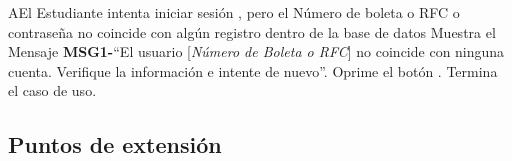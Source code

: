 		\begin{UCtrayectoriaA}{A}{El Estudiante intenta iniciar sesión , pero el Número de boleta o RFC o contraseña no coincide con algún registro dentro de la base de datos}
			\UCpaso Muestra el Mensaje {\bf MSG1-}``El usuario [{\em Número de Boleta o RFC}] no coincide con ninguna cuenta. Verifique la información e intente de nuevo''.
			\UCpaso[\UCactor] Oprime el botón .
			\UCpaso[] Termina el caso de uso.
		\end{UCtrayectoriaA}
		

\subsection{Puntos de extensión}
		
		
		
